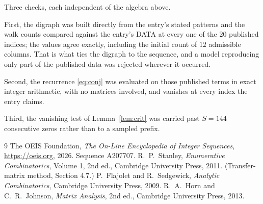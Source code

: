 \documentclass[11pt,a4paper]{article}
\theoremstyle{plain}
\theoremstyle{definition}
\begin{document}
Three checks, each independent of the algebra above.

First, the digraph was built directly from the entry's stated patterns and the walk counts
compared against the entry's DATA at every one of the $20$ published indices; the
values agree exactly, including the initial count of $12$ admissible columns. That is
what ties the digraph to the sequence, and a model reproducing only part of the published
data was rejected wherever it occurred.

Second, the recurrence \eqref{eq:conj} was evaluated on those published terms in exact
integer arithmetic, with no matrices involved, and vanishes at every index the entry claims.

Third, the vanishing test of Lemma~\ref{lem:crit} was carried past $S=144$ consecutive
zeros rather than to a sampled prefix.

\begin{thebibliography}{9}
 The OEIS Foundation, \emph{The On-Line Encyclopedia of Integer
Sequences}, \url{https://oeis.org}, 2026. Sequence A207707.
 R.~P.~Stanley, \emph{Enumerative Combinatorics}, Volume 1, 2nd ed.,
Cambridge University Press, 2011. (Transfer-matrix method, Section 4.7.)
 P.~Flajolet and R.~Sedgewick, \emph{Analytic Combinatorics}, Cambridge
University Press, 2009.
 R.~A.~Horn and C.~R.~Johnson, \emph{Matrix Analysis}, 2nd ed., Cambridge
University Press, 2013.
\end{thebibliography}
\end{document}
